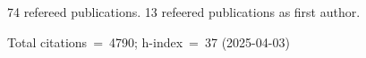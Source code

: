 74 refereed publications. 13 refeered publications as first author.

Total citations~=~4790; h-index~=~37 (2025-04-03)